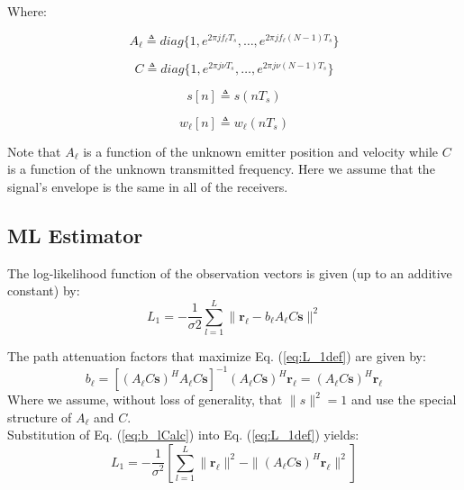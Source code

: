 \documentclass[10pt,a4paper]{report}
\begin{document}
Where:

\begin{equation}
A_\ell \triangleq diag\{1,e^{2 \pi j f_\ell  T_s},\dots,e^{2 \pi j f_\ell (N-1) T_s} \}                                                         
\end{equation}

\begin{equation}
C \triangleq diag \{1  ,e^{2 \pi j \nu T_s},\dots,e^{2 \pi j \nu (N-1) T_s }\}                                                         
\end{equation}

\begin{equation}
s[n] \triangleq s(nT_s)                                                                                                          
\end{equation}

\begin{equation}
w_\ell [n] \triangleq w_\ell (nT_s)                                                                                                       
\end{equation}

Note that $A_\ell$  is a function of the unknown emitter position and velocity while $C$ is a function of the unknown transmitted frequency.
Here we assume that the signal's envelope is the same in all of the receivers.

\subsection{ML Estimator}

The log-likelihood function of the observation vectors is given (up to an additive constant) by:
\begin{equation}
\label{eq:L_1def}
L_1 = -\frac{1}{\sigma{2}} \sum_{l=1}^{L} \|\mathbf{r_\ell} - b_\ell A_\ell C \mathbf{s}\|^2                                                             
\end{equation}

The path attenuation factors that maximize Eq. (\ref{eq:L_1def}) are given by:
\begin{equation}
\label{eq:b_lCalc}
b_\ell = [(A_\ell C \mathbf{s})^{H} A_\ell C \mathbf{s}]^{-1}(A_\ell C \mathbf{s})^{H} \mathbf{r_\ell} = (A_\ell C \mathbf{s})^{H} \mathbf{r_\ell}
\end{equation}
Where we assume, without loss of generality, that $\|s \|^{2}=1$ and use the special structure of $A_\ell$
and $C$.\\
Substitution of Eq. (\ref{eq:b_lCalc}) into Eq. (\ref{eq:L_1def}) yields:
\begin{equation}
\label{eq:L_1Def2}
L_1=-\frac{1}{\sigma^2} [\sum_{l=1}^{L}\|\mathbf{r_\ell}\|^2 -\|(A_\ell C \mathbf{s})^H \mathbf{r_\ell}\|^2]
\end{equation}
\end{document}

